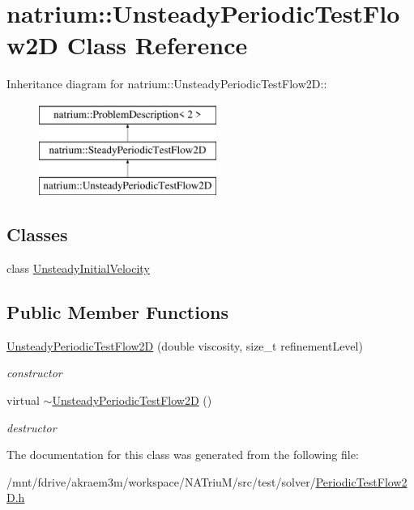 \hypertarget{classnatrium_1_1UnsteadyPeriodicTestFlow2D}{
\section{natrium::UnsteadyPeriodicTestFlow2D Class Reference}
\label{classnatrium_1_1UnsteadyPeriodicTestFlow2D}
}
Inheritance diagram for natrium::UnsteadyPeriodicTestFlow2D::\begin{figure}[H]
\begin{center}
\leavevmode
\includegraphics[height=3cm]{classnatrium_1_1UnsteadyPeriodicTestFlow2D}
\end{center}
\end{figure}
\subsection*{Classes}
\begin{DoxyCompactItemize}
\item 
class \hyperlink{classnatrium_1_1UnsteadyPeriodicTestFlow2D_1_1UnsteadyInitialVelocity}{UnsteadyInitialVelocity}
\end{DoxyCompactItemize}
\subsection*{Public Member Functions}
\begin{DoxyCompactItemize}
\item 
\hypertarget{classnatrium_1_1UnsteadyPeriodicTestFlow2D_a3a513d06c9018e78041cf8179ef2d80f}{
\hyperlink{classnatrium_1_1UnsteadyPeriodicTestFlow2D_a3a513d06c9018e78041cf8179ef2d80f}{UnsteadyPeriodicTestFlow2D} (double viscosity, size\_\-t refinementLevel)}
\label{classnatrium_1_1UnsteadyPeriodicTestFlow2D_a3a513d06c9018e78041cf8179ef2d80f}

\begin{DoxyCompactList}\small\item\em constructor \item\end{DoxyCompactList}\item 
\hypertarget{classnatrium_1_1UnsteadyPeriodicTestFlow2D_aa91ea175e2993bf00f8a48fded987c54}{
virtual \hyperlink{classnatrium_1_1UnsteadyPeriodicTestFlow2D_aa91ea175e2993bf00f8a48fded987c54}{$\sim$UnsteadyPeriodicTestFlow2D} ()}
\label{classnatrium_1_1UnsteadyPeriodicTestFlow2D_aa91ea175e2993bf00f8a48fded987c54}

\begin{DoxyCompactList}\small\item\em destructor \item\end{DoxyCompactList}\end{DoxyCompactItemize}


The documentation for this class was generated from the following file:\begin{DoxyCompactItemize}
\item 
/mnt/fdrive/akraem3m/workspace/NATriuM/src/test/solver/\hyperlink{PeriodicTestFlow2D_8h}{PeriodicTestFlow2D.h}\end{DoxyCompactItemize}
